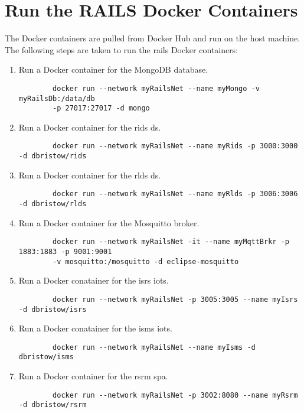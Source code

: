 \section{Run the RAILS Docker Containers}
\label{sec:railsdockercontainers}
The Docker containers are pulled from Docker Hub and run on the host machine. The following steps are taken to run the \gls{rails} Docker containers:
\begin{enumerate}
    \item Run a Docker container for the MongoDB database.
        \begin{verbatim}
        docker run --network myRailsNet --name myMongo -v myRailsDb:/data/db
        -p 27017:27017 -d mongo
        \end{verbatim}
    \item Run a Docker container for the \gls{rids} \gls{ds}.
        \begin{verbatim}
        docker run --network myRailsNet --name myRids -p 3000:3000 -d dbristow/rids
        \end{verbatim}
    \item Run a Docker container for the \gls{rlds} \gls{ds}.
        \begin{verbatim}
        docker run --network myRailsNet --name myRlds -p 3006:3006 -d dbristow/rlds
        \end{verbatim}
    \item Run a Docker container for the Mosquitto broker.
        \begin{verbatim}
        docker run --network myRailsNet -it --name myMqttBrkr -p 1883:1883 -p 9001:9001
        -v mosquitto:/mosquitto -d eclipse-mosquitto
        \end{verbatim}
    \item Run a Docker conatainer for the \gls{isrs} \gls{iots}.
        \begin{verbatim}
        docker run --network myRailsNet -p 3005:3005 --name myIsrs -d dbristow/isrs
        \end{verbatim}
    \item Run a Docker conatainer for the \gls{isms} \gls{iots}.
        \begin{verbatim}
        docker run --network myRailsNet --name myIsms -d dbristow/isms
        \end{verbatim}
    \item Run a Docker container for the \gls{rsrm} \gls{spa}.
        \begin{verbatim}
        docker run --network myRailsNet -p 3002:8080 --name myRsrm -d dbristow/rsrm
        \end{verbatim}
\end{enumerate}


